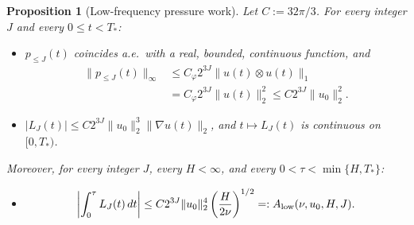 \documentclass[11pt]{article}
\newtheorem{proposition}[theorem]{Proposition}
\theoremstyle{definition}
\theoremstyle{plain}
\newcommand{\norm}[1]{\lVert #1\rVert}
\begin{document}
\begin{proposition}[Low-frequency pressure work]\label{prop:lowpressure}
Let $C:=32\pi/3$.  For every integer $J$ and every $0\le t<T_*$:
\begin{itemize}
\item[(i)] $p_{\le J}(t)$ coincides a.e.\ with a real, bounded, continuous
function, and
\[
\begin{aligned}
 \norm{p_{\le J}(t)}_\infty
 &\le C_\varphi2^{3J}\norm{u(t)\otimes u(t)}_1\\
 &=C_\varphi2^{3J}\norm{u(t)}_2^2
 \le C2^{3J}\norm{u_0}_2^2 .
\end{aligned}
\]
\item[(ii)] $|L_J(t)|\le C2^{3J}\norm{u_0}_2^3\norm{\nabla u(t)}_2$, and
$t\mapsto L_J(t)$ is continuous on $[0,T_*)$.
\end{itemize}
Moreover, for every integer $J$, every $H<\infty$, and every
$0<\tau<\min\{H,T_*\}$:
\begin{itemize}
\item[(iii)] \begin{equation}\label{eq:lowpressure}
 \left|\int_0^\tau L_J(t)\,dt\right|
 \leq C2^{3J}\norm{u_0}_2^4\left(\frac{H}{2\nu}\right)^{1/2}
 =:A_{\rm low}(\nu,u_0,H,J).
\end{equation}
\end{itemize}
\end{proposition}
\end{document}
